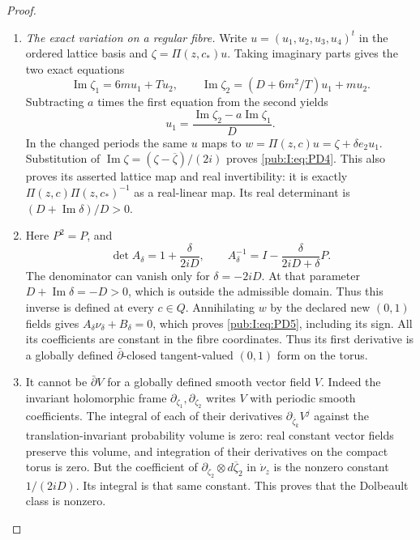 \begin{proof}
\begin{enumerate}[label=\arabic*.,leftmargin=*]
\item \emph{The exact variation on a regular fibre.}
Write $u=(u_1,u_2,u_3,u_4)^t$ in the ordered lattice basis and
$\zeta=\Pi(z,c_*)u$. Taking imaginary parts gives the two exact equations
\begin{equation}
 \operatorname{Im}\zeta_1=6m u_1+T u_2,\qquad
 \operatorname{Im}\zeta_2=(D+6m^2/T)u_1+m u_2.
\label{pub:I:eq:PD13}
\end{equation}
Subtracting $a$ times the first equation from the second yields
\begin{equation}
 u_1=\frac{\operatorname{Im}\zeta_2-a\operatorname{Im}\zeta_1}{D}.
\label{pub:I:eq:PD14}
\end{equation}
In the changed periods the same $u$ maps to
$w=\Pi(z,c)u=\zeta+\delta e_2u_1$. Substitution of
$\operatorname{Im}\zeta=(\zeta-\overline\zeta)/(2i)$ proves \eqref{pub:I:eq:PD4}.
This also proves its asserted lattice map and real invertibility:
it is exactly $\Pi(z,c)\Pi(z,c_*)^{-1}$ as a real-linear map.
Its real determinant is $(D+\operatorname{Im}\delta)/D>0$.


\item Here $P^2=P$, and
\begin{equation}
 \det A_\delta=1+\frac\delta{2iD},\qquad
 A_\delta^{-1}=I-\frac{\delta}{2iD+\delta}P.
\label{pub:I:eq:PD15}
\end{equation}
The denominator can vanish only for $\delta=-2iD$. At that parameter
$D+\operatorname{Im}\delta=-D>0$, which is outside the admissible
domain. Thus this inverse is defined at every $c\in Q$.
Annihilating $w$ by the declared new $(0,1)$ fields gives
$A_\delta\nu_\delta+B_\delta=0$, which proves \eqref{pub:I:eq:PD5}, including
its sign. All its coefficients are constant in the fibre coordinates.
Thus its first derivative is a globally defined $\bar\partial$-closed
tangent-valued $(0,1)$ form on the torus.

\item It cannot be $\bar\partial V$ for a globally defined smooth vector
field $V$. Indeed the invariant holomorphic frame
$\partial_{\zeta_1},\partial_{\zeta_2}$ writes $V$ with periodic
smooth coefficients. The integral of each of their derivatives
$\partial_{\overline\zeta_k}V^j$ against the translation-invariant
probability volume is zero: real constant vector fields preserve this
volume, and integration of their derivatives on the compact torus is
zero. But the coefficient of
$\partial_{\zeta_2}\otimes d\overline\zeta_2$ in $\dot\nu_z$ is
the nonzero constant $1/(2iD)$. Its integral is that same constant.
This proves that the Dolbeault class is nonzero.


\end{enumerate}
\end{proof}
